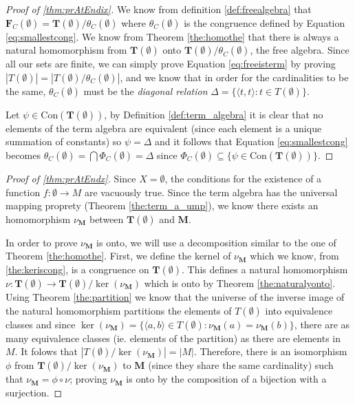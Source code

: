 \label{proofsection:prAtEndix}\begin{proof}[Proof of \autoref{thm:prAtEndix}]\label{proof:prAtEndix}We know from definition \ref {def:freealgebra} that $\boldsymbol {F}_C(\emptyset ) = \boldsymbol {T}(\emptyset ) / \theta _C(\emptyset )$ where $\theta _C(\emptyset )$ is the congruence defined by Equation \ref {eq:smallestcong}. We know from Theorem \ref {the:homothe} that there is always a natural homomorphism from $\boldsymbol {T}(\emptyset )$ onto $\boldsymbol {T}(\emptyset ) / \theta _C(\emptyset )$, the free algebra. Since all our sets are finite, we can simply prove Equation \ref {eq:freeisterm} by proving $\left | T(\emptyset ) \right | = \left | T(\emptyset ) / \theta _C(\emptyset ) \right |$, and we know that in order for the cardinalities to be the same, $\theta _C(\emptyset )$ must be the \textit {diagonal relation} $\Delta = \{\langle t,t \rangle : t \in T(\emptyset )\}$. \par Let $\psi \in \text {Con}(\boldsymbol {T}(\emptyset ))$, by Definition \ref {def:term_algebra} it is clear that no elements of the term algebra are equivalent (since each element is a unique summation of constants) so $\psi = \Delta $ and it follows that Equation \ref {eq:smallestcong} becomes $\theta _C(\emptyset ) = \bigcap \Phi _C(\emptyset ) = \Delta $ since $\Phi _C(\emptyset ) \subseteq \{ \psi \in \text {Con}(\boldsymbol {T}(\emptyset ))\}$.\end{proof}
\label{proofsection:prAtEndx}\begin{proof}[Proof of \autoref{thm:prAtEndx}]\label{proof:prAtEndx}Since $X = \emptyset $, the conditions for the existence of a function $f : \emptyset \rightarrow M$ are vacuously true. Since the term algebra has the universal mapping proprety (Theorem \ref {the:term_a_ump}), we know there exists an homomorphism $\nu _{\boldsymbol {M}}$ between $\boldsymbol {T}(\emptyset )$ and $\boldsymbol {M}$. \par In order to prove $\nu _{\boldsymbol {M}}$ is onto, we will use a decomposition similar to the one of Theorem \ref {the:homothe}. First, we define the kernel of $\nu _{\boldsymbol {M}}$ which we know, from \ref {the:keriscong}, is a congruence on $\boldsymbol {T}(\emptyset )$. This defines a natural homomorphism $\nu : \boldsymbol {T}(\emptyset ) \rightarrow \boldsymbol {T}(\emptyset )/\ker (\nu _{\boldsymbol {M}})$ which is onto by Theorem \ref {the:naturalyonto}. Using Theorem \ref {the:partition} we know that the universe of the inverse image of the natural homomorphism partitions the elements of $T(\emptyset )$ into equivalence classes and since $\ker (\nu _{\boldsymbol {M}}) = \{ \langle a,b\rangle \in T(\emptyset ) : \nu _{\boldsymbol {M}}(a) = \nu _{\boldsymbol {M}}(b) \}$, there are as many equivalence classes (ie. elements of the partition) as there are elements in $M$. It folows that $|T(\emptyset )/\ker (\nu _{\boldsymbol {M}})| = |M|$. Therefore, there is an isomorphism $\phi $ from $\boldsymbol {T}(\emptyset )/\ker (\nu _{\boldsymbol {M}})$ to $\boldsymbol {M}$ (since they share the same cardinality) such that $\nu _{\boldsymbol {M}} = \phi \circ \nu $; proving $\nu _{\boldsymbol {M}}$ is onto by the composition of a bijection with a surjection.\end{proof}
